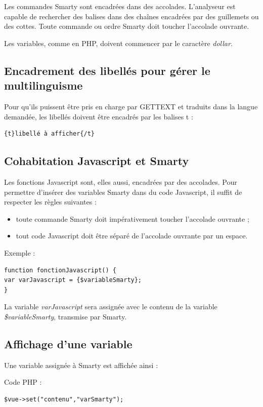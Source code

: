 Les commandes Smarty sont encadrées dans des accolades. L'analyseur est capable de rechercher des balises dans des chaînes encadrées par des guillemets ou des cottes. Toute commande ou ordre Smarty doit toucher l'accolade ouvrante.

Les variables, comme en PHP, doivent commencer par le caractère \textit{dollar}.

\subsection{Encadrement des libellés pour gérer le multilinguisme}

Pour qu'ils puissent être pris en charge par GETTEXT et traduits dans la langue demandée, les libellés doivent être encadrés par les balises t :
\begin{lstlisting}
{t}libellé à afficher{/t}
\end{lstlisting}

\subsection{Cohabitation Javascript et Smarty}

Les fonctions Javascript sont, elles aussi, encadrées par des accolades. Pour permettre d'insérer des variables Smarty dans du code Javascript, il suffit de respecter les règles suivantes :
\begin{itemize}
\item toute commande Smarty doit impérativement toucher l'accolade ouvrante ;
\item tout code Javascript doit être séparé de l'accolade ouvrante par un espace.
\end{itemize}

Exemple :
\begin{lstlisting}
function fonctionJavascript() {
var varJavascript = {$variableSmarty};
}
\end{lstlisting}

La variable \textit{varJavascript} sera assignée avec le contenu de la variable \textit{\$variableSmarty}, transmise par Smarty.

\subsection{Affichage d'une variable}

Une variable assignée à Smarty est affichée ainsi :

Code PHP :
\begin{lstlisting}
$vue->set("contenu","varSmarty");
\end{lstlisting}

